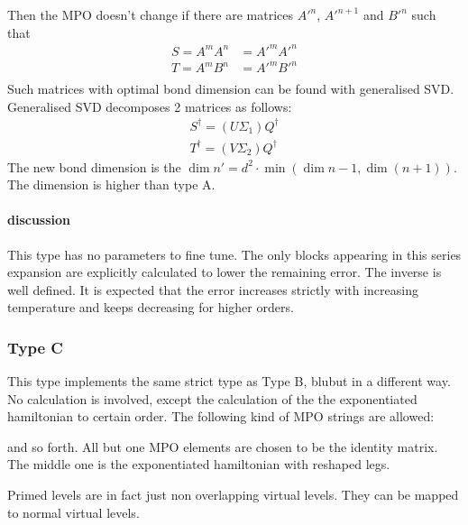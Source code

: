 Then the MPO doesn't change if there are matrices $A'^{n}$, $A'^{n+1}$ and $B'^{n}$ such that
\begin{equation}
	\begin{split}
		S=A^{m} A^{n} &= A'^{m} A'^{n} \\
		T=A^{m} B^{n} &= A'^{m} B'^{n} \\
	\end{split}
\end{equation}
Such matrices with optimal bond dimension can be found with generalised SVD. Generalised SVD decomposes 2 matrices as follows:
\begin{equation}
	\begin{split}
		S^{\dagger} = (U \Sigma_1) Q^{\dagger} \\
		T^{\dagger} = (V \Sigma_2) Q^{\dagger}
	\end{split}
\end{equation}
The new bond dimension is the $\dim{n'} =d^2 \cdot \min( \dim{n-1}, \dim (n+1) )$.  The dimension is higher than type A.


\paragraph{discussion}

This type has no parameters to fine tune. The only blocks appearing in this series expansion are explicitly calculated to lower the remaining error. The inverse is well defined. It is expected that the error increases strictly with increasing temperature and keeps decreasing for higher orders.

\subsubsection{Type C}

This type implements the same strict type as Type B, blubut in a different way. No calculation is involved, except the calculation of the the exponentiated hamiltonian to certain order. The following kind of MPO strings are allowed:

and so forth. All but one MPO elements are chosen to be the identity matrix. The middle one is the exponentiated hamiltonian with reshaped legs.

Primed levels are in fact just non overlapping virtual levels. They can be mapped to normal virtual levels.

